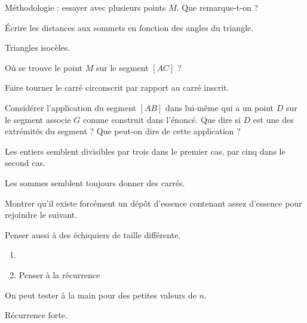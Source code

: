 \begin{Hint}{24}
 Méthodologie : essayer avec plusieurs points $M$. Que remarque-t-on ?


\end{Hint}
\begin{Hint}{25}
\'Ecrire les distances aux sommets en fonction des angles du triangle.
\end{Hint}
\begin{Hint}{26}
Triangles isocèles.
\end{Hint}
\begin{Hint}{27}
Où se trouve le point $M$ sur le segment $[AC]$ ?
\end{Hint}
\begin{Hint}{28}
Faire tourner le carré circonscrit par rapport au carré inscrit.
\end{Hint}
\begin{Hint}{29}
 Considérer l'application du segment $[AB]$ dans lui-même qui a un point $D$ sur le segment associe $G$ comme construit dans l'énoncé. Que dire si $D$ est une des extrémités du segment ? Que peut-on dire de cette application ? %
\end{Hint}
\begin{Hint}{30}
Les entiers semblent divisibles par trois dans le premier cas, par cinq dans le second cas.
\end{Hint}
\begin{Hint}{32}
Les sommes semblent toujours donner des carrés.
\end{Hint}
\begin{Hint}{33}
Montrer qu'il existe forcément un dépôt d'essence contenant assez d'essence pour rejoindre le suivant.
\end{Hint}
\begin{Hint}{34}
Penser aussi à des échiquiers de taille différente.
\end{Hint}
\begin{Hint}{38}
\begin{enumerate}
\item
\item Penser à la récurrence
\end{enumerate}
\end{Hint}
\begin{Hint}{39}
On peut tester à la main pour des petites valeurs de $n$.
\end{Hint}
\begin{Hint}{42}
Récurrence forte.
\end{Hint}
